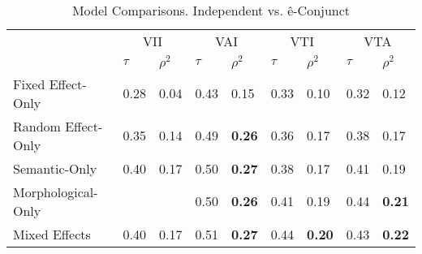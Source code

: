        
        \begin{table}[h!]
            \centering
            \begin{tabular}{lllllllll}
            \toprule
            & \multicolumn{2}{c}{VII}                          & \multicolumn{2}{c}{VAI}                          & \multicolumn{2}{c}{VTI}          & \multicolumn{2}{c}{VTA}                         \\
            & $\tau$      &$\rho^{2}$      & $\tau$      &$\rho^{2}$ & $\tau$           &$\rho^{2}$      & $\tau$      &$\rho^{2}$ \\
            \midrule
            Fixed Effect-Only  & 0.28 & 0.04 & 0.43 & 0.15 & 0.33 & 0.10 & 0.32 & 0.12 \\   
            Random Effect-Only & 0.35 & 0.14 & 0.49 & \textbf{0.26} & 0.36 & 0.17 & 0.38 & 0.17 \\ 
            Semantic-Only      & 0.40 & 0.17 & 0.50 & \textbf{0.27} & 0.38 & 0.17 & 0.41 & 0.19 \\
            Morphological-Only &      &      & 0.50 & \textbf{0.26} & 0.41 & 0.19 & 0.44 & \textbf{0.21} \\
            Mixed Effects      & 0.40 & 0.17 & 0.51 & \textbf{0.27} & 0.44 & \textbf{0.20} & 0.43 &\textbf{0.22} \\
        
            \bottomrule
            \end{tabular}
            \caption{
               Model Comparisons. Independent vs. ê-Conjunct \\ \label{tab:randvsfullive}
              }
        \end{table}


